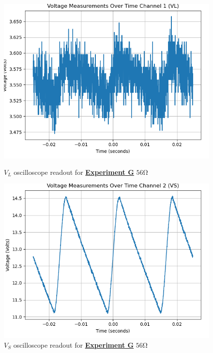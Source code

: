\documentclass[
	letterpaper
	12pt
]{template}
\newcommand{\bref}[2]{\textbf{\hyperref[#1]{#2}}}
\begin{document}
\begin{figure}[H]\label{data::G4}
	\centering
	\begin{minipage}[c]{0.45\textwidth}
		\centering
		\includegraphics[width=\textwidth]{figures/G/4--ch1.png}
	    \caption{$V_{L}$ oscilloscope readout for \bref{exp::G}{Experiment G} $56\unit{\ohm}$ }
	\end{minipage}
	\hfill
	\begin{minipage}[c]{0.45\textwidth}
		\centering
		\includegraphics[width=\textwidth]{figures/G/4--ch2.png}
	    \caption{$V_{S}$ oscilloscope readout for \bref{exp::G}{Experiment G} $56\unit{\ohm}$ }
	\end{minipage}
\end{figure}
\end{document}
